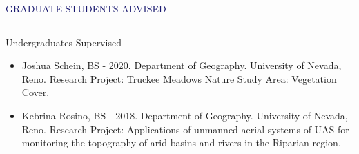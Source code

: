 \documentclass{resume} %
\renewenvironment{rSection}[1]{
\sectionskip
\textcolor{MidnightBlue}{\MakeUppercase{#1}}
\sectionlineskip
\hrule
\begin{list}{}{
\setlength{\leftmargin}{1.5em}
}
\item[]
}{
\end{list}
}
\begin{document}
\begin{rSection}{Graduate Students Advised}
\begin{rSubsection}{Undergraduates Supervised}{}{}{}
\begin{itemize}
  \item[] Joshua Schein, BS - 2020. Department of Geography. University of Nevada, Reno. Research Project: Truckee Meadows Nature Study Area: Vegetation Cover.
  
  \item[] Kebrina Rosino, BS - 2018. Department of Geography. University of Nevada, Reno. Research Project: Applications of unmanned aerial systems of UAS for monitoring the topography of arid basins and rivers in the Riparian region. \end{itemize}

\end{rSubsection}
\end{rSection}

\end{document}
